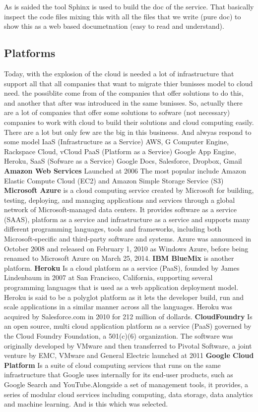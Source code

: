 As is saided the tool Sphinx is used to build the doc of the service.
That basically inspect the code files mixing this with all the files
that we write (pure doc) to show this as a web based documetnation
(easy to read and understand).


\subsection{Platforms}

Today, with the explosion of the cloud is needed a lot of infrastructure that support
all that all companies that want to migrate thier bunisses model to cloud need. the possiblite
come from of the companies that offer solutions to do this, and another that after
was introduced in the same bunisses.
So, actually there are a lot of companies that offer some solutions to sofware (not necessary)
companies to work with cloud to build their solutions and cloud computing easily.
\intro
There are a lot but only few are the big in this busineess. And alwyas respond to some
model IaaS (Infrastructure as a Service)
AWS, G Computer Engine, Rackspace Cloud, vCloud PaaS (Platform as a Service)
Google App Engine, Heroku, SaaS (Sofware as a Service) Google Docs, Salesforce, Dropbox, Gmail
\intro
\textbf{Amazon Web Services}
\intro
Launched at 2006 The most popular include Amazon Elastic
Compute Cloud (EC2) and Amazon Simple Storage Service (S3)
\intro
\textbf{Microsoft Azure}
\intro
is a cloud computing service created by Microsoft for building, testing, deploying,
and managing applications and services through a global network of Microsoft-managed
data centers. It provides software as a service (SAAS), platform as a service and
infrastructure as a service and supports many different programming languages,
tools and frameworks, including both Microsoft-specific and third-party software and systems.
Azure was announced in October 2008 and released on February 1, 2010 as Windows
 Azure, before being renamed to Microsoft Azure on March 25, 2014.
\intro
\textbf{IBM BlueMix}
\intro
is another platform.
\intro
\textbf{Heroku}
\intro
Is a cloud platform as a service (PaaS), founded by James Lindenbaum in 2007 at
 San Francisco, California, supporting several programming languages that is used
 as a web application deployment model.
 Heroku is said to be a polyglot platform as it lets the developer build,
 run and scale applications in a similar manner across all the languages.
 Heroku was acquired by Salesforce.com in 2010 for 212 million of dollards.
\intro
\textbf{CloudFoundry}
\intro Is an open source, multi cloud application platform as a service
(PaaS) governed by the Cloud Foundry Foundation, a 501(c)(6) organization.
The software was originally developed by VMware and then transferred to Pivotal Software,
a joint venture by EMC, VMware and General Electric launched at 2011
\intro
\textbf{Google Cloud Platform}
\intro Is a suite of cloud computing services
that runs on the same infrastructure that Google uses internally for its end-user
products, such as Google Search and YouTube.Alongside a set of management tools,
it provides, a series of modular cloud services including computing, data storage,
data analytics and machine learning.
\intro
And is this which was selected.

